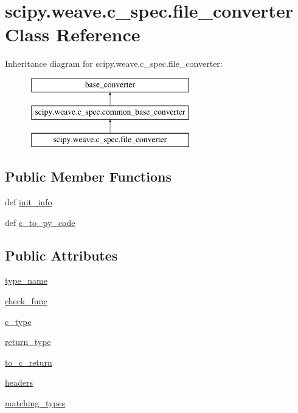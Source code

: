 \hypertarget{classscipy_1_1weave_1_1c__spec_1_1file__converter}{}\section{scipy.\+weave.\+c\+\_\+spec.\+file\+\_\+converter Class Reference}
\label{classscipy_1_1weave_1_1c__spec_1_1file__converter}
Inheritance diagram for scipy.\+weave.\+c\+\_\+spec.\+file\+\_\+converter\+:\begin{figure}[H]
\begin{center}
\leavevmode
\includegraphics[height=3.000000cm]{classscipy_1_1weave_1_1c__spec_1_1file__converter}
\end{center}
\end{figure}
\subsection*{Public Member Functions}
\begin{DoxyCompactItemize}
\item 
def \hyperlink{classscipy_1_1weave_1_1c__spec_1_1file__converter_a928f00944f9afa9e5171eddc194fc02f}{init\+\_\+info}
\item 
def \hyperlink{classscipy_1_1weave_1_1c__spec_1_1file__converter_a094fd2177087bf6f2fcc1a2097de93fa}{c\+\_\+to\+\_\+py\+\_\+code}
\end{DoxyCompactItemize}
\subsection*{Public Attributes}
\begin{DoxyCompactItemize}
\item 
\hyperlink{classscipy_1_1weave_1_1c__spec_1_1file__converter_acaaf2e501ece970679516c12d4b5e54d}{type\+\_\+name}
\item 
\hyperlink{classscipy_1_1weave_1_1c__spec_1_1file__converter_ab97f96bd8a337d89f64ac41ee82b5b2f}{check\+\_\+func}
\item 
\hyperlink{classscipy_1_1weave_1_1c__spec_1_1file__converter_ae8899b6e30c0ec6df659586638ecb5df}{c\+\_\+type}
\item 
\hyperlink{classscipy_1_1weave_1_1c__spec_1_1file__converter_a316c480a6c03c2282bf6044298ad2a51}{return\+\_\+type}
\item 
\hyperlink{classscipy_1_1weave_1_1c__spec_1_1file__converter_a025123a536d56643eed420d0efce3a10}{to\+\_\+c\+\_\+return}
\item 
\hyperlink{classscipy_1_1weave_1_1c__spec_1_1file__converter_ab030cf0698b2ffe943360812194bb9ce}{headers}
\item 
\hyperlink{classscipy_1_1weave_1_1c__spec_1_1file__converter_a6232ab9c5852ff9e77183b61002daee8}{matching\+\_\+types}
\end{DoxyCompactItemize}



